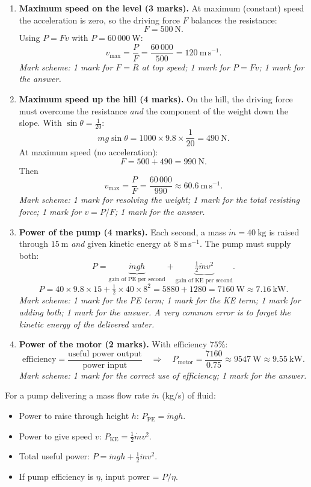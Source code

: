 \documentclass[11pt]{article}
\begin{document}
\begin{corrige}
\begin{enumerate}
\item \textbf{Maximum speed on the level (3 marks).} At maximum (constant) speed the acceleration is zero, so the driving force $F$ balances the resistance:
\[
F = 500\ \mathrm{N}.
\]
Using $P = Fv$ with $P = 60\,000\ \mathrm{W}$:
\[
v_{\max} = \frac{P}{F} = \frac{60\,000}{500} = 120\ \mathrm{m\,s^{-1}}.
\]
\textit{Mark scheme: 1 mark for $F = R$ at top speed; 1 mark for $P = Fv$; 1 mark for the answer.}

\item \textbf{Maximum speed up the hill (4 marks).} On the hill, the driving force must overcome the resistance \emph{and} the component of the weight down the slope. With $\sin\theta = \tfrac{1}{20}$:
\[
mg\sin\theta = 1000\times 9.8\times \frac{1}{20} = 490\ \mathrm{N}.
\]
At maximum speed (no acceleration):
\[
F = 500 + 490 = 990\ \mathrm{N}.
\]
Then
\[
v_{\max} = \frac{P}{F} = \frac{60\,000}{990} \approx 60.6\ \mathrm{m\,s^{-1}}.
\]
\textit{Mark scheme: 1 mark for resolving the weight; 1 mark for the total resisting force; 1 mark for $v = P/F$; 1 mark for the answer.}

\item \textbf{Power of the pump (4 marks).} Each second, a mass $\dot{m} = 40\ \mathrm{kg}$ is raised through $15\ \mathrm{m}$ \emph{and} given kinetic energy at $8\ \mathrm{m\,s^{-1}}$. The pump must supply both:
\[
P = \underbrace{\dot{m}gh}_{\text{gain of PE per second}} + \underbrace{\tfrac{1}{2}\dot{m}v^{2}}_{\text{gain of KE per second}}.
\]
\[
P = 40\times 9.8\times 15 + \tfrac{1}{2}\times 40\times 8^{2} = 5880 + 1280 = 7160\ \mathrm{W} \approx 7.16\ \mathrm{kW}.
\]
\textit{Mark scheme: 1 mark for the PE term; 1 mark for the KE term; 1 mark for adding both; 1 mark for the answer. A very common error is to forget the kinetic energy of the delivered water.}

\item \textbf{Power of the motor (2 marks).} With efficiency $75\%$:
\[
\text{efficiency} = \frac{\text{useful power output}}{\text{power input}}
\quad\Longrightarrow\quad
P_{\text{motor}} = \frac{7160}{0.75} \approx 9547\ \mathrm{W} \approx 9.55\ \mathrm{kW}.
\]
\textit{Mark scheme: 1 mark for the correct use of efficiency; 1 mark for the answer.}
\end{enumerate}

\begin{propriete}
For a pump delivering a mass flow rate $\dot{m}$ (kg/s) of fluid:
\begin{itemize}
\item Power to raise through height $h$: $P_{\text{PE}} = \dot{m}gh$.
\item Power to give speed $v$: $P_{\text{KE}} = \frac{1}{2}\dot{m}v^2$.
\item Total useful power: $P = \dot{m}gh + \frac{1}{2}\dot{m}v^2$.
\item If pump efficiency is $\eta$, input power = $P/\eta$.
\end{itemize}
\end{propriete}
\end{corrige}
\end{document}
